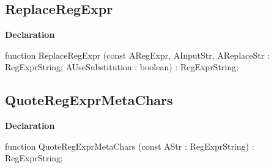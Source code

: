 \documentclass{report}
\newif\ifpdf
\begin{document}
\subsection*{ReplaceRegExpr}
\fi
\label{RegExpr-ReplaceRegExpr}
\begin{list}{}{
\setlength{\itemindent}{0cm}
\setlength{\listparindent}{0cm}
\setlength{\leftmargin}{\evensidemargin}
\addtolength{\leftmargin}{\tmplength}
\settowidth{\labelsep}{X}
\addtolength{\leftmargin}{\labelsep}
\setlength{\labelwidth}{\tmplength}
}
\item[\textbf{Declaration}\hfill]
\ifpdf
\begin{flushleft}
\fi
\begin{ttfamily}
function ReplaceRegExpr (const ARegExpr, AInputStr, AReplaceStr : RegExprString; AUseSubstitution : boolean) : RegExprString;\end{ttfamily}

\ifpdf
\end{flushleft}
\fi

\end{list}
\ifpdf
\subsection*{\large{\textbf{QuoteRegExprMetaChars}}\normalsize\hspace{1ex}\hrulefill}
\else
\subsection*{QuoteRegExprMetaChars}
\fi
\label{RegExpr-QuoteRegExprMetaChars}
\begin{list}{}{
\setlength{\itemindent}{0cm}
\setlength{\listparindent}{0cm}
\setlength{\leftmargin}{\evensidemargin}
\addtolength{\leftmargin}{\tmplength}
\settowidth{\labelsep}{X}
\addtolength{\leftmargin}{\labelsep}
\setlength{\labelwidth}{\tmplength}
}
\item[\textbf{Declaration}\hfill]
\ifpdf
\begin{flushleft}
\fi
\begin{ttfamily}
function QuoteRegExprMetaChars (const AStr : RegExprString) : RegExprString;\end{ttfamily}

\ifpdf
\end{flushleft}
\fi

\end{list}
\ifpdf
\end{document}
